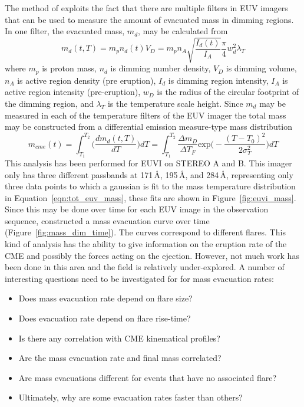 The method of \citet{aschw09} exploits the fact that there are multiple filters in EUV imagers that can be used to measure the amount of evacuated mass in dimming regions. In one filter, the evacuated mass, $m_d$, may be calculated from
\begin{equation}
m_d(t,T) = m_p n_d(t)V_D = m_p n_A\sqrt{\frac{I_d(t)}{I_A}}\frac{\pi}{4}w_d^2\lambda_T
\end{equation}
where $m_p$ is proton mass, $n_d$ is dimming number density, $V_D$ is dimming volume, $n_A$ is active region density (pre eruption), $I_d$ is dimming region intensity, $I_A$ is active region intensity (pre-eruption), $w_D$ is the radius of the circular footprint of the dimming region, and $\lambda_T$ is the temperature scale height. Since $m_d$ may be measured in each of the temperature filters of the EUV imager the total mass may be constructed from a differential emission measure-type mass distribution
\begin{equation}
m_{cme}(t)=\int_{T_1}^{T_2}\bigg( \frac{dm_d(t,T)}{dT} \bigg)dT = \int_{T_1}^{T_2}\frac{\Delta m_D}{\Delta T_F}\mathrm{exp}\bigg( -\frac{(T-T_0)^2}{2\sigma_T^2} \bigg)dT
\label{eqn:tot_euv_mass}
\end{equation}
This analysis has been performed for EUVI on STEREO A and B. This imager only has three different passbands at 171\,\AA, 195\,\AA, and 284\,\AA, representing only three data points to which a gaussian is fit to the mass temperature distribution in Equation~\ref{eqn:tot_euv_mass}, these fits are shown in Figure~\ref{fig:euvi_mass}.
Since this may be done over time for each EUV image in the observation sequence, \citet{aschw09} constructed a mass evacuation curve over time (Figure~\ref{fig:mass_dim_time}). The curves correspond to different flares. This kind of analysis has the ability to give information on the eruption rate of the CME and possibly the forces acting on the ejection. However, not much work has been done in this area and the field is relatively under-explored. A number of interesting questions need to be investigated for for mass evacuation rates:
\begin{itemize}
\item Does mass evacuation rate depend on flare size?
\item Does evacuation rate depend on flare rise-time?
\item Is there any correlation with CME kinematical profiles?
\item Are the mass evacuation rate and final mass correlated?
\item Are mass evacuations different for events that have no associated flare?
\item Ultimately, why are some evacuation rates faster than others?
\end{itemize}
